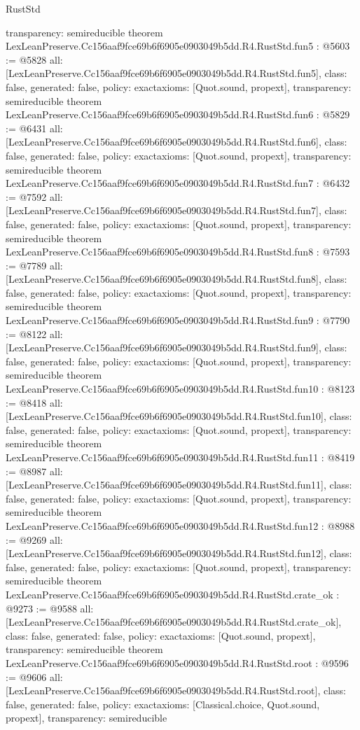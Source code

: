 \begin{lexlean}{RustStd}
\begin{coremodule}
{  transparency: semireducible
}
theorem LexLeanPreserve.Cc156aaf9fce69b6f6905e0903049b5dd.R4.RustStd.fun5 : @5603 := @5828 {
  all: [LexLeanPreserve.Cc156aaf9fce69b6f6905e0903049b5dd.R4.RustStd.fun5],
  class: false,
  generated: false,
  policy: exact{axioms: [Quot.sound, propext]},
  transparency: semireducible
}
theorem LexLeanPreserve.Cc156aaf9fce69b6f6905e0903049b5dd.R4.RustStd.fun6 : @5829 := @6431 {
  all: [LexLeanPreserve.Cc156aaf9fce69b6f6905e0903049b5dd.R4.RustStd.fun6],
  class: false,
  generated: false,
  policy: exact{axioms: [Quot.sound, propext]},
  transparency: semireducible
}
theorem LexLeanPreserve.Cc156aaf9fce69b6f6905e0903049b5dd.R4.RustStd.fun7 : @6432 := @7592 {
  all: [LexLeanPreserve.Cc156aaf9fce69b6f6905e0903049b5dd.R4.RustStd.fun7],
  class: false,
  generated: false,
  policy: exact{axioms: [Quot.sound, propext]},
  transparency: semireducible
}
theorem LexLeanPreserve.Cc156aaf9fce69b6f6905e0903049b5dd.R4.RustStd.fun8 : @7593 := @7789 {
  all: [LexLeanPreserve.Cc156aaf9fce69b6f6905e0903049b5dd.R4.RustStd.fun8],
  class: false,
  generated: false,
  policy: exact{axioms: [Quot.sound, propext]},
  transparency: semireducible
}
theorem LexLeanPreserve.Cc156aaf9fce69b6f6905e0903049b5dd.R4.RustStd.fun9 : @7790 := @8122 {
  all: [LexLeanPreserve.Cc156aaf9fce69b6f6905e0903049b5dd.R4.RustStd.fun9],
  class: false,
  generated: false,
  policy: exact{axioms: [Quot.sound, propext]},
  transparency: semireducible
}
theorem LexLeanPreserve.Cc156aaf9fce69b6f6905e0903049b5dd.R4.RustStd.fun10 : @8123 := @8418 {
  all: [LexLeanPreserve.Cc156aaf9fce69b6f6905e0903049b5dd.R4.RustStd.fun10],
  class: false,
  generated: false,
  policy: exact{axioms: [Quot.sound, propext]},
  transparency: semireducible
}
theorem LexLeanPreserve.Cc156aaf9fce69b6f6905e0903049b5dd.R4.RustStd.fun11 : @8419 := @8987 {
  all: [LexLeanPreserve.Cc156aaf9fce69b6f6905e0903049b5dd.R4.RustStd.fun11],
  class: false,
  generated: false,
  policy: exact{axioms: [Quot.sound, propext]},
  transparency: semireducible
}
theorem LexLeanPreserve.Cc156aaf9fce69b6f6905e0903049b5dd.R4.RustStd.fun12 : @8988 := @9269 {
  all: [LexLeanPreserve.Cc156aaf9fce69b6f6905e0903049b5dd.R4.RustStd.fun12],
  class: false,
  generated: false,
  policy: exact{axioms: [Quot.sound, propext]},
  transparency: semireducible
}
theorem LexLeanPreserve.Cc156aaf9fce69b6f6905e0903049b5dd.R4.RustStd.crate_ok : @9273 := @9588 {
  all: [LexLeanPreserve.Cc156aaf9fce69b6f6905e0903049b5dd.R4.RustStd.crate_ok],
  class: false,
  generated: false,
  policy: exact{axioms: [Quot.sound, propext]},
  transparency: semireducible
}
theorem LexLeanPreserve.Cc156aaf9fce69b6f6905e0903049b5dd.R4.RustStd.root : @9596 := @9606 {
  all: [LexLeanPreserve.Cc156aaf9fce69b6f6905e0903049b5dd.R4.RustStd.root],
  class: false,
  generated: false,
  policy: exact{axioms: [Classical.choice, Quot.sound, propext]},
  transparency: semireducible
}


\end{coremodule}
\end{lexlean}

